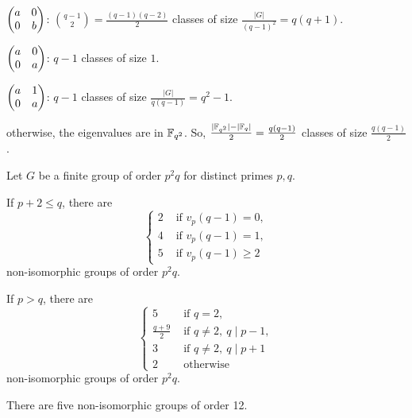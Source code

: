 \documentclass{../note}
\begin{document}
\begin{prb}
\begin{parts}
\item $\begin{pmatrix}a&0\\0&b\end{pmatrix}$: $\binom{q-1}2=\frac{(q-1)(q-2)}2$ classes of size $\frac{|G|}{(q-1)^2}=q(q+1)$.
\item $\begin{pmatrix}a&0\\0&a\end{pmatrix}$: $q-1$ classes of size $1$.
\item $\begin{pmatrix}a&1\\0&a\end{pmatrix}$: $q-1$ classes of size $\frac{|G|}{q(q-1)}=q^2-1$.
\item otherwise, the eigenvalues are in $\mathbb{F}_{q^2}$. So, $\frac{|\mathbb{F}_{q^2}|-|\mathbb{F}_q|}2=\frac{q(q-1)}2$ classes of size $\frac{q(q-1)}2$.
\end{parts}
\end{prb}
\begin{prb}
Let $G$ be a finite group of order $p^2q$ for distinct primes $p,q$.
\begin{parts}
\item If $p+2\le q$, there are
\[\begin{cases}
2&\text{ if }v_p(q-1)=0,\\
4&\text{ if }v_p(q-1)=1,\\
5&\text{ if }v_p(q-1)\ge2
\end{cases}\]
non-isomorphic groups of order $p^2q$.
\item If $p>q$, there are
\[\begin{cases}
5&\text{ if }q=2,\\
\frac{q+9}2&\text{ if }q\ne2,\ q\mid p-1,\\
3&\text{ if }q\ne2,\ q\mid p+1\\
2&\text{ otherwise }
\end{cases}\]
non-isomorphic groups of order $p^2q$.
\item There are five non-isomorphic groups of order 12.
\end{parts}
\end{prb}
\end{document}
